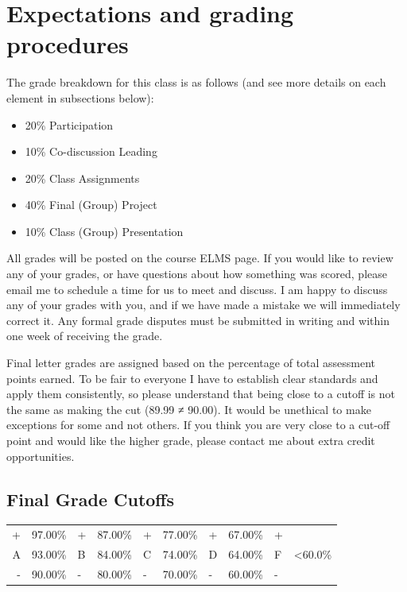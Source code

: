 \documentclass[
]{book}
\providecommand{\tightlist}{%
  \setlength{\itemsep}{0pt}\setlength{\parskip}{0pt}}
\begin{document}
\hypertarget{expectations-and-grading-procedures}{%
\section{Expectations and grading procedures}\label{expectations-and-grading-procedures}}

The grade breakdown for this class is as follows (and see more details on each element in subsections below):

\begin{itemize}
\tightlist
\item
  20\% Participation
\item
  10\% Co-discussion Leading
\item
  20\% Class Assignments
\item
  40\% Final (Group) Project
\item
  10\% Class (Group) Presentation
\end{itemize}

All grades will be posted on the course ELMS page. If you would like to review any of your grades, or have questions about how something was scored, please email me to schedule a time for us to meet and discuss. I am happy to discuss any of your grades with you, and if we have made a mistake we will immediately correct it. Any formal grade disputes must be submitted in writing and within one week of receiving the grade.

Final letter grades are assigned based on the percentage of total assessment points earned. To be fair to everyone I have to establish clear standards and apply them consistently, so please understand that being close to a cutoff is not the same as making the cut (89.99 ≠ 90.00). It would be unethical to make exceptions for some and not others. If you think you are very close to a cut-off point and would like the higher grade, please contact me about extra credit opportunities.

\hypertarget{final-grade-cutoffs}{%
\subsection{Final Grade Cutoffs}\label{final-grade-cutoffs}}

\begin{longtable}[]{@{}rlllllllll@{}}
\toprule
\endhead
+ & 97.00\% & + & 87.00\% & + & 77.00\% & + & 67.00\% & + &\tabularnewline
A & 93.00\% & B & 84.00\% & C & 74.00\% & D & 64.00\% & F & \textless60.0\%\tabularnewline
- & 90.00\% & - & 80.00\% & - & 70.00\% & - & 60.00\% & - &\tabularnewline
\bottomrule
\end{longtable}
\end{document}
